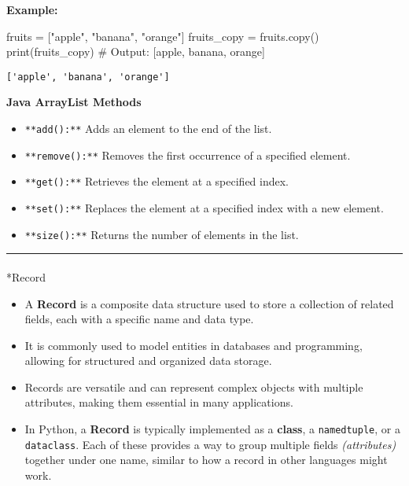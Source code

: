 \documentclass[
  letterpaper,
  DIV=11,
  numbers=noendperiod]{scrreprt}
\makeatletter
\let\oldparagraph\paragraph
\renewcommand{\paragraph}{
    \@ifstar
      \xxxParagraphStar
      \xxxParagraphNoStar
  }
\newcommand{\xxxParagraphStar}[1]{\oldparagraph*{#1}\mbox{}}
\newcommand{\xxxParagraphNoStar}[1]{\oldparagraph{#1}\mbox{}}
\newenvironment{Shaded}{\begin{snugshade}}{\end{snugshade}}
\newcommand{\BuiltInTok}[1]{\textcolor[rgb]{0.00,0.23,0.31}{#1}}
\newcommand{\CommentTok}[1]{\textcolor[rgb]{0.37,0.37,0.37}{#1}}
\newcommand{\NormalTok}[1]{\textcolor[rgb]{0.00,0.23,0.31}{#1}}
\newcommand{\OperatorTok}[1]{\textcolor[rgb]{0.37,0.37,0.37}{#1}}
\newcommand{\StringTok}[1]{\textcolor[rgb]{0.13,0.47,0.30}{#1}}
\providecommand{\tightlist}{%
  \setlength{\itemsep}{0pt}\setlength{\parskip}{0pt}}
\makeatother
\begin{document}
\textbf{Example:}

\begin{Shaded}
\begin{Highlighting}[]
\NormalTok{fruits }\OperatorTok{=}\NormalTok{ [}\StringTok{"apple"}\NormalTok{, }\StringTok{"banana"}\NormalTok{, }\StringTok{"orange"}\NormalTok{]}
\NormalTok{fruits\_copy }\OperatorTok{=}\NormalTok{ fruits.copy()}
\BuiltInTok{print}\NormalTok{(fruits\_copy)  }\CommentTok{\# Output: [\textquotesingle{}apple\textquotesingle{}, \textquotesingle{}banana\textquotesingle{}, \textquotesingle{}orange\textquotesingle{}]}
\end{Highlighting}
\end{Shaded}

\begin{verbatim}
['apple', 'banana', 'orange']
\end{verbatim}

\textbf{Java ArrayList Methods}

\begin{itemize}
\tightlist
\item
  \texttt{**add():**} Adds an element to the end of the list.
\item
  \texttt{**remove():**} Removes the first occurrence of a specified
  element.
\item
  \texttt{**get():**} Retrieves the element at a specified index.
\item
  \texttt{**set():**} Replaces the element at a specified index with a
  new element.
\item
  \texttt{**size():**} Returns the number of elements in the list.
\end{itemize}

\begin{center}\rule{0.5\linewidth}{0.5pt}\end{center}

\paragraph*{Record}\label{record}

\begin{itemize}
\tightlist
\item
  A \textbf{Record} is a composite data structure used to store a
  collection of related fields, each with a specific name and data type.
\item
  It is commonly used to model entities in databases and programming,
  allowing for structured and organized data storage.
\item
  Records are versatile and can represent complex objects with multiple
  attributes, making them essential in many applications.
\item
  In Python, a \textbf{Record} is typically implemented as a
  \textbf{class}, a \texttt{namedtuple}, or a \texttt{dataclass}. Each
  of these provides a way to group multiple fields \emph{(attributes)}
  together under one name, similar to how a record in other languages
  might work.
\end{itemize}
\end{document}
